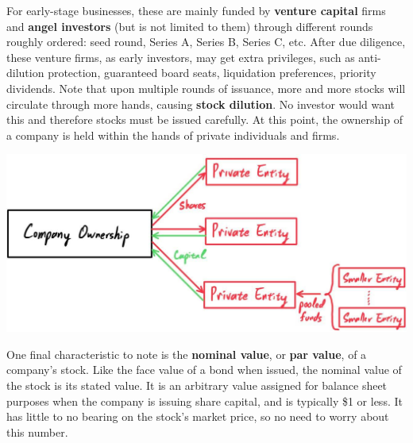 \documentclass{article}
\begin{document}
  For early-stage businesses, these are mainly funded by \textbf{venture capital} firms and \textbf{angel investors} (but is not limited to them) through different rounds roughly ordered: seed round, Series A, Series B, Series C, etc. After due diligence, these venture firms, as early investors, may get extra privileges, such as anti-dilution protection, guaranteed board seats, liquidation preferences, priority dividends. Note that upon multiple rounds of issuance, more and more stocks will circulate through more hands, causing \textbf{stock dilution}. No investor would want this and therefore stocks must be issued carefully. At this point, the ownership of a company is held within the hands of private individuals and firms.
  \begin{center}
      \includegraphics[scale=0.25]{img/company_in_private_hands.jpg}
  \end{center}
  One final characteristic to note is the \textbf{nominal value}, or \textbf{par value}, of a company's stock. Like the face value of a bond when issued, the nominal value of the stock is its stated value. It is an arbitrary value assigned for balance sheet purposes when the company is issuing share capital, and is typically \$1 or less. It has little to no bearing on the stock's market price, so no need to worry about this number.
\end{document}
